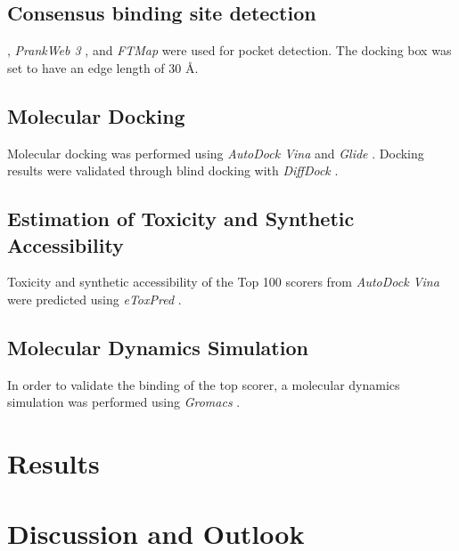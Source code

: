 \documentclass[11pt, letterpaper, titlepage]{article}
\begin{document}
\subsection{Consensus binding site detection}
 \cite{package_Fpocket}, \textit{PrankWeb 3} \cite{package_P2Rank,package_PrankWeb,package_PrankWeb3}, and \textit{FTMap} \cite{package_FTMAP} were used for pocket detection. The docking box was set to have an edge length of 30 \AA.

\subsection{Molecular Docking}
Molecular docking was performed using \textit{AutoDock Vina} \cite{Trott.2010} and \textit{Glide} \cite{Friesner2004}. Docking results were validated through blind docking with \textit{DiffDock} \cite{Corso.2022}.

\subsection{Estimation of Toxicity and Synthetic Accessibility}
Toxicity and synthetic accessibility of the Top 100 scorers from \textit{AutoDock Vina} were predicted using \textit{eToxPred} \cite{pu2019toxpred}.

\subsection{Molecular Dynamics Simulation}
In order to validate the binding of the top scorer, a molecular dynamics simulation was performed using \textit{Gromacs} \cite{packageGROMACS}.

\section{Results}


\FloatBarrier

\section{Discussion and Outlook}



\pagebreak
\FloatBarrier
\renewcommand{\bibname}{References}  %
\printbibliography
\end{document}
